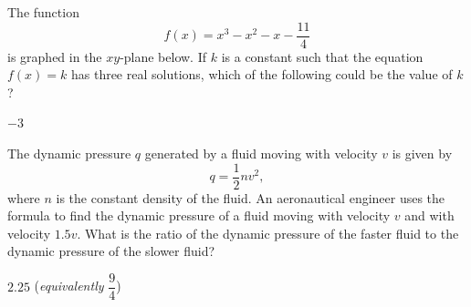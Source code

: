 \newpage




\question[1]
The function
\[
  f(x) = x^3 - x^2 - x - \frac{11}{4}
\]
is graphed in the $xy$-plane below. If $k$ is a constant such that the equation $f(x) = k$ has three real solutions, which of the following could be the value of $k$?
\begin{center}
\end{center}
\begin{solution}
$-3$
\end{solution}



\newpage



\question[1]
The dynamic pressure $q$ generated by a fluid moving with velocity $v$ is given by
\[
  q = \frac{1}{2} n v^2,
\]
where $n$ is the constant density of the fluid. An aeronautical engineer uses the formula to find the dynamic pressure of a fluid moving with velocity $v$ and with velocity $1.5v$. What is the ratio of the dynamic pressure of the faster fluid to the dynamic pressure of the slower fluid?
\begin{solution}
$2.25$ \quad (\textit{equivalently} $\dfrac{9}{4}$)
\end{solution}

